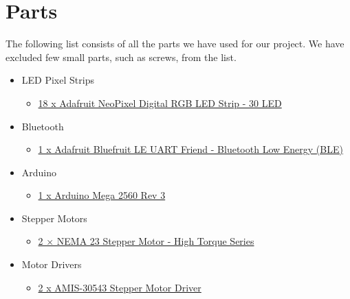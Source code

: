\documentclass[11pt]{IEEEtran}
\begin{document}
\section{Parts}
The following list consists of all the parts we have used for our project. We have excluded few small parts, such as screws, from the list. 
\begin{itemize}
\item LED Pixel Strips
  \begin{itemize}
  \item \href{https://www.adafruit.com/product/1376?length=2}{18 x Adafruit NeoPixel Digital RGB LED Strip - 30 LED}
  \end{itemize}

\item Bluetooth 
  \begin{itemize}
  \item \href{https://www.adafruit.com/product/2479}{1 x Adafruit Bluefruit LE UART Friend - Bluetooth Low Energy (BLE)}
  \end{itemize}

\item Arduino 
  \begin{itemize}
  \item \href{https://store.arduino.cc/usa/arduino-mega-2560-rev3}{1 x Arduino Mega 2560 Rev 3}
  \end{itemize}

\item Stepper Motors
  \begin{itemize}
  \item \href{https://openbuildspartstore.com/nema-23-stepper-motor-high-torque-series/}{2 × NEMA 23 Stepper Motor - High Torque Series}
  \end{itemize}

\item Motor Drivers
  \begin{itemize}
  \item \href{https://www.pololu.com/product/2970}{2 x AMIS-30543 Stepper Motor Driver}
  \end{itemize}


\end{itemize}
\end{document}
